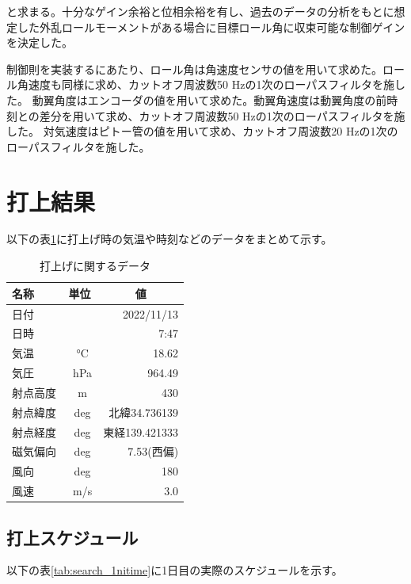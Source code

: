 \documentclass[a4paper,11pt,uplatex]{jsarticle}
\begin{document}
と求まる。十分なゲイン余裕と位相余裕を有し、過去のデータの分析をもとに想定した外乱ロールモーメントがある場合に目標ロール角に収束可能な制御ゲインを決定した。\par
制御則を実装するにあたり、ロール角は角速度センサの値を用いて求めた。ロール角速度も同様に求め、カットオフ周波数50 Hzの1次のローパスフィルタを施した。
動翼角度はエンコーダの値を用いて求めた。動翼角速度は動翼角度の前時刻との差分を用いて求め、カットオフ周波数50 Hzの1次のローパスフィルタを施した。
対気速度はピトー管の値を用いて求め、カットオフ周波数20 Hzの1次のローパスフィルタを施した。

\newpage
\section{打上結果}
以下の表\ref{tab:utiage_shogen}に打上げ時の気温や時刻などのデータをまとめて示す。
\begin{table}[H]
	\centering
	\caption{打上げに関するデータ}
	\label{tab:utiage_shogen}
	\begin{tabular}{lcr}
		\hline
		名称   & 単位                    & \multicolumn{1}{c}{値} \\
		\hline
		日付   &                       & 2022/11/13            \\
		日時   &                       & 7:47                  \\
		気温   & \SI{}{\degreeCelsius} & 18.62                 \\
		気圧   & \SI{}{hPa}            & 964.49                \\
		射点高度 & \SI{}{m}              & 430                   \\
		射点緯度 & \SI{}{deg}            & 北緯34.736139           \\
		射点経度 & \SI{}{deg}            & 東経139.421333          \\
		磁気偏向 & \SI{}{deg}            & 7.53(西偏)              \\
		風向   & \SI{}{deg}            & 180                   \\
		風速   & \SI{}{m/s}            & 3.0                   \\
		\hline
	\end{tabular}
\end{table}

\subsection{打上スケジュール}
以下の表\ref{tab:search_1nitime}に1日目の実際のスケジュールを示す。
\end{document}
